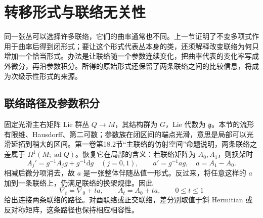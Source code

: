 
% 
% 

\section{转移形式与联络无关性}
\label{g2:sec:2202}

同一张丛可以选择许多联络，它们的曲率通常也不同。上一节证明了不变多项式作用于曲率后得到闭形式；要让这个形式代表丛本身的类，还须解释改变联络为何只增加一个恰当形式。办法是让联络随一个参数连续变化，把曲率代表的变化率写成外微分，再沿参数积分。所得的原始形式还保留了两条联络之间的比较信息，将成为次级示性形式的来源。

\subsection{联络路径及参数积分}
\label{g2:subsec:2202:01}
固定光滑主右矩阵 Lie 群丛 \(Q\to M\)，其结构群为 \(G\)，Lie 代数为 \(\mathfrak g\)。本节的流形有限维、Hausdorff、第二可数；参数族在闭区间的端点光滑，意思是局部可以光滑延拓到稍大的区间。第一卷第18.2节“主联络的仿射空间”命题说明，两条联络之差属于 \(\Omega^1(M;\operatorname{ad}Q)\)。恢复它在局部的含义：若联络矩阵为 \(A_0,A_1\)，则换架时
\[
	A_j'=g^{-1}A_jg+g^{-1}\mathrm dg\quad(j=0,1),
	\qquad a'=g^{-1}ag,\quad a=A_1-A_0.
\]
相减后微分项消去，故 \(a\) 是一张整体伴随丛值一形式。反过来，将任意这样的 \(a\) 加到一条联络上，仍满足联络的换架规律。因此
\begin{equation}\label{g2:eq:affine-connection-path}
	\nabla_t=\nabla_0+t a,\qquad A_t=A_0+t a,\qquad 0\le t\le1
\end{equation}
给出连接两条联络的路径。对酉联络或正交联络，差分别取值于斜 Hermitian 或反对称矩阵，这条路径也保持相应相容性。

